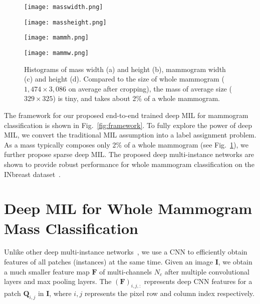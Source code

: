 \documentclass[runningheads,a4paper]{llncs}
\begin{document}
\begin{figure}[t]
	\setlength{\abovecaptionskip}{0.cm}
	\setlength{\belowcaptionskip}{-0.cm}
	\begin{center}
		\begin{minipage}{0.245\linewidth}
			\centerline{\texttt{[image: masswidth.png]}}
		\end{minipage}
		\begin{minipage}{0.245\linewidth}
			\centerline{\texttt{[image: massheight.png]}}
		\end{minipage}
		\begin{minipage}{0.245\linewidth}
			\centerline{\texttt{[image: mammh.png]}}
		\end{minipage}
		\begin{minipage}{0.245\linewidth}
			\centerline{\texttt{[image: mammw.png]}}
		\end{minipage}
		\caption{Histograms of mass width (a) and height (b), mammogram width (c) and height (d). Compared to the size of whole mammogram ($1,474 \times 3,086$ on average after cropping), the mass of average size ($329 \times 325$) is tiny, and takes about 2\% of a whole mammogram. }
		\label{fig:mass}
	\end{center}
\end{figure}

The framework for our proposed end-to-end trained deep MIL for mammogram classification is shown in Fig.~\ref{fig:framework}. To fully explore the power of deep MIL, we convert the traditional MIL assumption into a label assignment problem. As a mass typically composes only 2\% of a whole mammogram (see Fig.~\ref{fig:mass}), we further propose sparse deep MIL. The proposed deep multi-instance networks are shown to provide robust performance for whole mammogram classification on the INbreast dataset~\cite{moreira2012inbreast}.%
\section{Deep MIL for Whole Mammogram Mass Classification}\label{sec:dmlmamm}
Unlike other deep multi-instance networks~\cite{yan2016multi,hou2015patch}, we use a CNN to efficiently obtain features of all patches (instances) at the same time. Given an image $\bm{I}$, we obtain a much smaller feature map $\bm{F}$ of multi-channels $N_c$ after multiple convolutional layers and max pooling layers. The $(\bm{F})_{i,j,:}$ represents deep CNN features for a patch $\bm{Q}_{i,j}$ in $\bm{I}$, where $i,j$ represents the pixel row and column index respectively.%
\end{document}
